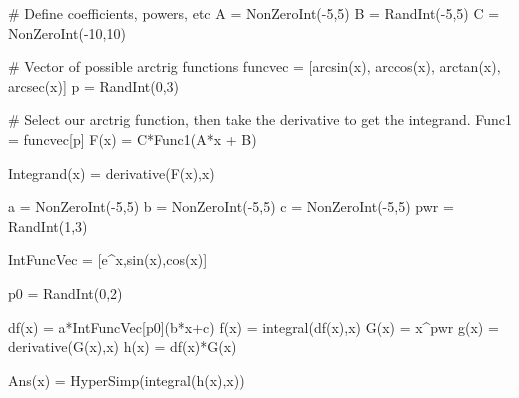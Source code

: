 




\begin{sagesilent}
# Define coefficients, powers, etc
A = NonZeroInt(-5,5)
B = RandInt(-5,5)
C = NonZeroInt(-10,10)


# Vector of possible arctrig functions
funcvec = [arcsin(x), arccos(x), arctan(x), arcsec(x)]
p = RandInt(0,3)

# Select our arctrig function, then take the derivative to get the integrand.
Func1 = funcvec[p]
F(x) = C*Func1(A*x + B)

Integrand(x) = derivative(F(x),x)

\end{sagesilent}




\begin{sagesilent}
a = NonZeroInt(-5,5)
b = NonZeroInt(-5,5)
c = NonZeroInt(-5,5)
pwr = RandInt(1,3)

IntFuncVec = [e^x,sin(x),cos(x)]

p0 = RandInt(0,2)

df(x) = a*IntFuncVec[p0](b*x+c)
f(x) = integral(df(x),x)
G(x) = x^pwr 
g(x) = derivative(G(x),x)
h(x) = df(x)*G(x)

Ans(x) = HyperSimp(integral(h(x),x))

\end{sagesilent}


